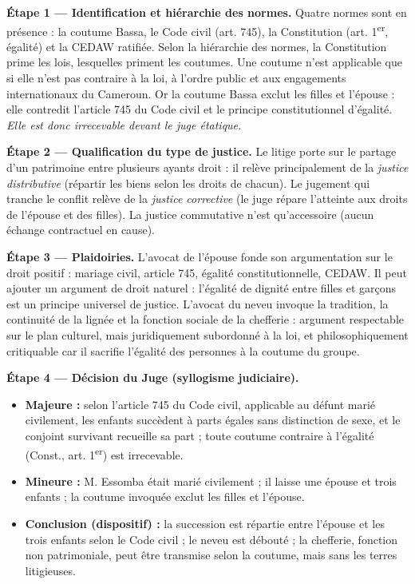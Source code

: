 \documentclass[11pt]{article}
\begin{document}
\begin{exoresolu}
\textbf{Étape 1 — Identification et hiérarchie des normes.} Quatre normes sont en présence : la coutume Bassa, le Code civil (art. 745), la Constitution (art. 1\textsuperscript{er}, égalité) et la CEDAW ratifiée. Selon la hiérarchie des normes, la Constitution prime les lois, lesquelles priment les coutumes. Une coutume n'est applicable que si elle n'est pas contraire à la loi, à l'ordre public et aux engagements internationaux du Cameroun. Or la coutume Bassa exclut les filles et l'épouse : elle contredit l'article 745 du Code civil et le principe constitutionnel d'égalité. \emph{Elle est donc irrecevable devant le juge étatique.}

\textbf{Étape 2 — Qualification du type de justice.} Le litige porte sur le partage d'un patrimoine entre plusieurs ayants droit : il relève principalement de la \emph{justice distributive} (répartir les biens selon les droits de chacun). Le jugement qui tranche le conflit relève de la \emph{justice corrective} (le juge répare l'atteinte aux droits de l'épouse et des filles). La justice commutative n'est qu'accessoire (aucun échange contractuel en cause).

\textbf{Étape 3 — Plaidoiries.} L'avocat de l'épouse fonde son argumentation sur le droit positif : mariage civil, article 745, égalité constitutionnelle, CEDAW. Il peut ajouter un argument de droit naturel : l'égalité de dignité entre filles et garçons est un principe universel de justice. L'avocat du neveu invoque la tradition, la continuité de la lignée et la fonction sociale de la chefferie : argument respectable sur le plan culturel, mais juridiquement subordonné à la loi, et philosophiquement critiquable car il sacrifie l'égalité des personnes à la coutume du groupe.

\textbf{Étape 4 — Décision du Juge (syllogisme judiciaire).}
\begin{itemize}
\item \textbf{Majeure :} selon l'article 745 du Code civil, applicable au défunt marié civilement, les enfants succèdent à parts égales sans distinction de sexe, et le conjoint survivant recueille sa part ; toute coutume contraire à l'égalité (Const., art. 1\textsuperscript{er}) est irrecevable.
\item \textbf{Mineure :} M. Essomba était marié civilement ; il laisse une épouse et trois enfants ; la coutume invoquée exclut les filles et l'épouse.
\item \textbf{Conclusion (dispositif) :} la succession est répartie entre l'épouse et les trois enfants selon le Code civil ; le neveu est débouté ; la chefferie, fonction non patrimoniale, peut être transmise selon la coutume, mais sans les terres litigieuses.
\end{itemize}


\end{exoresolu}
\end{document}

